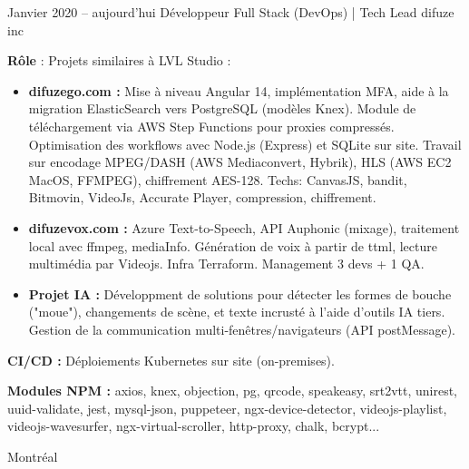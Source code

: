 \documentclass[
  a4paper,
   maincolor=cvblue,
   sectioncolor=cvblue,
   sidebarwidth=0.323\paperwidth,
]{fortysecondscv}
\begin{document}
\newpage
\restoregeometry
{}\paperwidth

\makefrontsidebar

\vspace*{-3.5em} %



\begin{cvtableNew}
  \cvitemRightNew
  {Janvier 2020 – aujourd’hui} %
  {Développeur Full Stack (DevOps) | Tech Lead} %
  {difuze inc} %
  {
    \vspace{0.1pt}
    \fontsize{10.8pt}{12pt}\selectfont
    \textbf{Rôle} : Projets similaires à LVL Studio :\vspace{5pt}

    \begin{itemize}[itemsep=-1mm, topsep=0pt, leftmargin=8pt]
      \item \textbf{difuzego.com :} Mise à niveau Angular 14, implémentation MFA, aide à la migration ElasticSearch vers PostgreSQL (modèles Knex). Module de téléchargement via AWS Step Functions pour proxies compressés. Optimisation des workflows avec Node.js (Express) et SQLite sur site. Travail sur encodage MPEG/DASH (AWS Mediaconvert, Hybrik), HLS (AWS EC2 MacOS, FFMPEG), chiffrement AES-128. Techs: CanvasJS, bandit, Bitmovin, VideoJs, Accurate Player, compression, chiffrement.\vspace{5pt}
      \item \textbf{difuzevox.com :} Azure Text-to-Speech, API Auphonic (mixage), traitement local avec ffmpeg, mediaInfo. Génération de voix à partir de ttml, lecture multimédia par Videojs. Infra Terraform. Management 3 devs + 1 QA.\vspace{5pt}
      \item \textbf{Projet IA :} Développment de solutions pour détecter les formes de bouche ("moue"), changements de scène, et texte incrusté à l'aide d'outils IA tiers. Gestion de la communication multi-fenêtres/navigateurs (API postMessage).\vspace{5pt}
    \end{itemize}

    \textbf{CI/CD :} Déploiements Kubernetes sur site (on-premises).\vspace{5pt}

    \textbf{Modules NPM :} axios, knex, objection, pg, qrcode, speakeasy, srt2vtt, unirest, uuid-validate, jest, mysql-json, puppeteer, ngx-device-detector, videojs-playlist, videojs-wavesurfer, ngx-virtual-scroller, http-proxy, chalk, bcrypt...
  }
  {Montréal} %


\end{cvtableNew}
\end{document}
